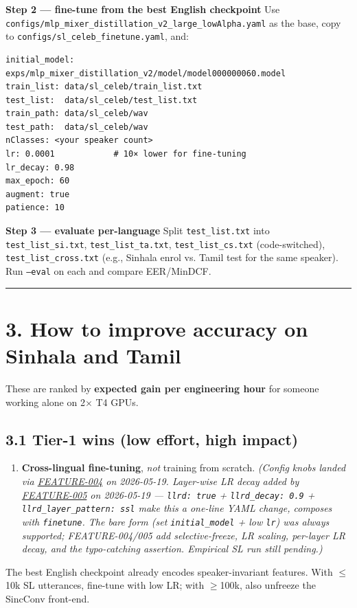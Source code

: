 \documentclass[10pt,a4paper]{article}
\begin{document}
\textbf{Step 2 --- fine-tune from the best English checkpoint} Use \texttt{configs/mlp\_mixer\_distillation\_v2\_large\_lowAlpha.yaml} as the base, copy to \texttt{configs/sl\_celeb\_finetune.yaml}, and:

\begin{Verbatim}[fontsize=\small,frame=single,framesep=4pt]
initial_model: exps/mlp_mixer_distillation_v2/model/model000000060.model
train_list: data/sl_celeb/train_list.txt
test_list:  data/sl_celeb/test_list.txt
train_path: data/sl_celeb/wav
test_path:  data/sl_celeb/wav
nClasses: <your speaker count>
lr: 0.0001            # 10× lower for fine-tuning
lr_decay: 0.98
max_epoch: 60
augment: true
patience: 10
\end{Verbatim}


\textbf{Step 3 --- evaluate per-language} Split \texttt{test\_list.txt} into \texttt{test\_list\_si.txt}, \texttt{test\_list\_ta.txt}, \texttt{test\_list\_cs.txt} (code-switched), \texttt{test\_list\_cross.txt} (e.g., Sinhala enrol vs. Tamil test for the same speaker). Run \texttt{--eval} on each and compare EER/MinDCF.

\vspace{0.5em}\hrule\vspace{0.5em}

\section*{3. How to improve accuracy on Sinhala and Tamil}

These are ranked by \textbf{expected gain per engineering hour} for someone working alone on 2$\times$ T4 GPUs.

\subsection*{3.1 Tier-1 wins (low effort, high impact)}

\begin{enumerate}[leftmargin=*,itemsep=2pt]
  \item \textbf{Cross-lingual fine-tuning}, \textit{not} training from scratch. \textit{(Config knobs landed via \href{docs/bugfixes/FEATURE-004-cross-lingual-finetune.md}{FEATURE-004} on 2026-05-19. Layer-wise LR decay added by \href{docs/bugfixes/FEATURE-005-llrd.md}{FEATURE-005} on 2026-05-19 --- \texttt{llrd: true} + \texttt{llrd\_decay: 0.9} + \texttt{llrd\_layer\_pattern: ssl} make this a one-line YAML change, composes with \texttt{finetune}. The bare form (set \texttt{initial\_model} + low \texttt{lr}) was always supported; FEATURE-004/005 add selective-freeze, LR scaling, per-layer LR decay, and the typo-catching assertion. Empirical SL run still pending.)}
\end{enumerate}
The best English checkpoint already encodes speaker-invariant features. With $\leq$10k SL utterances, fine-tune with low LR; with $\geq$100k, also unfreeze the SincConv front-end.
\end{document}
